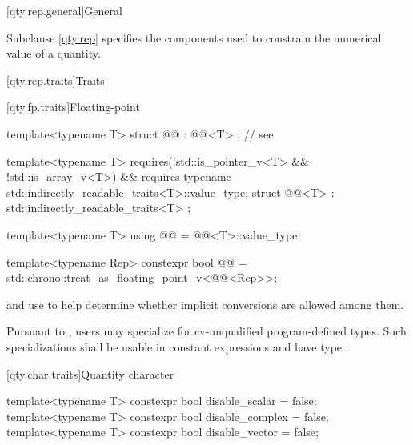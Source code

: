 [qty.rep.general]{General}

\pnum
Subclause \ref{qty.rep} specifies the components
used to constrain the numerical value of a quantity.

[qty.rep.traits]{Traits}

[qty.fp.traits]{Floating-point}

\begin{itemdecl}
template<typename T>
struct @@ : @@<T> {}; // see 

template<typename T>
  requires(!std::is_pointer_v<T> && !std::is_array_v<T>) &&
          requires { typename std::indirectly_readable_traits<T>::value_type; }
struct @@<T> : std::indirectly_readable_traits<T> {};

template<typename T>
using @@ = @@<T>::value_type;

template<typename Rep>
constexpr bool @@ =
  std::chrono::treat_as_floating_point_v<@@<Rep>>;
\end{itemdecl}

\begin{itemdescr}
\pnum
{} and  use 
to help determine whether implicit conversions are allowed among them.

\pnum
\remarks
Pursuant to ,
users may specialize 
for cv-unqualified program-defined types.
Such specializations shall be usable in constant expressions
and have type .
\end{itemdescr}

[qty.char.traits]{Quantity character}

\begin{itemdecl}
template<typename T>
constexpr bool disable_scalar = false;
template<typename T>
constexpr bool disable_complex = false;
template<typename T>
constexpr bool disable_vector = false;
\end{itemdecl}

